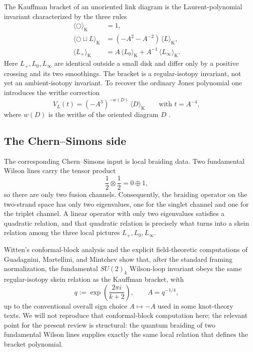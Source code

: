 \documentclass[11pt]{article}
\theoremstyle{definition}
\numberwithin{theorem}{section}
\numberwithin{equation}{section}
\begin{document}
The Kauffman bracket of an unoriented link diagram is the Laurent-polynomial invariant characterized by the three rules
\begin{align}
\langle \bigcirc \rangle_{\mathrm{K}} &= 1, \label{eq:kauffman-unknot} \\[1mm]
\langle \bigcirc \sqcup L \rangle_{\mathrm{K}}
&=
(-A^2-A^{-2})\,\langle L \rangle_{\mathrm{K}}, \label{eq:kauffman-loop} \\[1mm]
\langle L_+ \rangle_{\mathrm{K}}
&=
A\,\langle L_0 \rangle_{\mathrm{K}}
+
A^{-1}\,\langle L_\infty \rangle_{\mathrm{K}}. \label{eq:kauffman-skein}
\end{align}
Here $L_+,L_0,L_\infty$ are identical outside a small disk and differ only by a positive crossing and its two smoothings. The bracket is a regular-isotopy invariant, not yet an ambient-isotopy invariant. To recover the ordinary Jones polynomial one introduces the writhe correction
\begin{equation}\label{eq:jones-from-bracket}
V_L(t)
=
(-A^3)^{-w(D)}\,\langle D\rangle_{\mathrm{K}}
\qquad
\text{with }
t=A^{-4},
\end{equation}
where $w(D)$ is the writhe of the oriented diagram $D$ \cite{Kauffman1987}.

\subsection{The Chern--Simons side}

The corresponding Chern--Simons input is local braiding data. Two fundamental Wilson lines carry the tensor product
\begin{equation}\label{eq:fundamental-fusion}
\frac12 \otimes \frac12 = 0 \oplus 1,
\end{equation}
so there are only two fusion channels. Consequently, the braiding operator on the two-strand space has only two eigenvalues, one for the singlet channel and one for the triplet channel. A linear operator with only two eigenvalues satisfies a quadratic relation, and that quadratic relation is precisely what turns into a skein relation among the three local pictures $L_+,L_0,L_\infty$.

\medskip

\noindent Witten's conformal-block analysis \cite{Witten1989Jones} and the explicit field-theoretic computations of Guadagnini, Martellini, and Mintchev \cite{GuadagniniMartelliniMintchev1990} show that, after the standard framing normalization, the fundamental $SU(2)_k$ Wilson-loop invariant obeys the same regular-isotopy skein relation as the Kauffman bracket, with
\begin{equation}\label{eq:q-and-A}
q := \exp\left(\frac{2\pi i}{k+2}\right),
\qquad
A = q^{-1/4},
\end{equation}
up to the conventional overall sign choice $A \mapsto -A$ used in some knot-theory texts. We will not reproduce that conformal-block computation here; the relevant point for the present review is structural: the quantum braiding of two fundamental Wilson lines supplies exactly the same local relation that defines the bracket polynomial.
\end{document}
